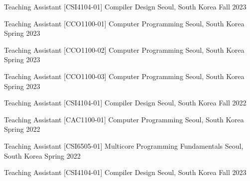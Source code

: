 

\begin{cventries}

  \cventry
    {Teaching Assistant} %
    {[CSI4104-01] Compiler Design} %
    {Seoul, South Korea} %
    {Fall 2023} %
    {}

  \cventry
    {Teaching Assistant} %
    {[CCO1100-01] Computer Programming} %
    {Seoul, South Korea} %
    {Spring 2023} %
    {}

  \cventry
    {Teaching Assistant} %
    {[CCO1100-02] Computer Programming} %
    {Seoul, South Korea} %
    {Spring 2023} %
    {}

  \cventry
    {Teaching Assistant} %
    {[CCO1100-03] Computer Programming} %
    {Seoul, South Korea} %
    {Spring 2023} %
    {}

  \cventry
    {Teaching Assistant} %
    {[CSI4104-01] Compiler Design} %
    {Seoul, South Korea} %
    {Fall 2022} %
    {}

  \cventry
    {Teaching Assistant} %
    {[CAC1100-01] Computer Programming} %
    {Seoul, South Korea} %
    {Spring 2022} %
    {}

  \cventry
    {Teaching Assistant} %
    {[CSI6505-01] Multicore Programming Fundamentals} %
    {Seoul, South Korea} %
    {Spring 2022} %
    {}

    \cventry
    {Teaching Assistant} %
    {[CSI4104-01] Compiler Design} %
    {Seoul, South Korea} %
    {Fall 2023} %
    {}
\end{cventries}
